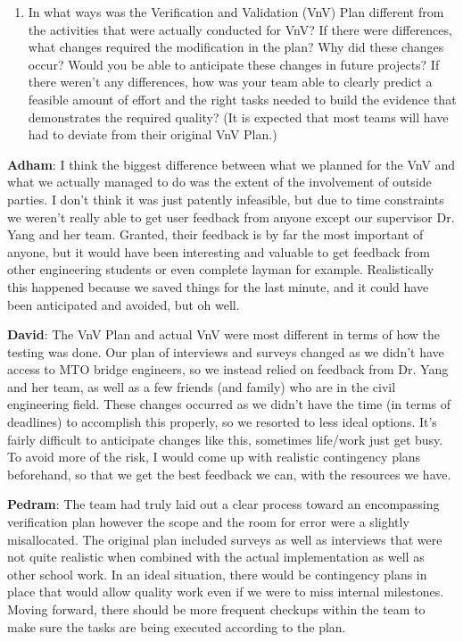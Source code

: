 \documentclass[12pt, titlepage]{article}
\begin{document}
\begin{enumerate}
  \item In what ways was the Verification and Validation (VnV) Plan different
  from the activities that were actually conducted for VnV?  If there were
  differences, what changes required the modification in the plan?  Why did
  these changes occur?  Would you be able to anticipate these changes in future
  projects?  If there weren't any differences, how was your team able to clearly
  predict a feasible amount of effort and the right tasks needed to build the
  evidence that demonstrates the required quality?  (It is expected that most
  teams will have had to deviate from their original VnV Plan.)
\end{enumerate}

\textbf{Adham}: I think the biggest difference between what we planned for the VnV and what we actually managed to do was the extent of the involvement of outside parties. I don't think it was just patently infeasible, but due to time constraints we weren't really able to get user feedback from anyone except our supervisor Dr. Yang and her team. Granted, their feedback is by far the most important of anyone, but it would have been interesting and valuable to get feedback from other engineering students or even complete layman for example. Realistically this happened because we saved things for the last minute, and it could have been anticipated and avoided, but oh well.

\textbf{David}: The VnV Plan and actual VnV were most different in terms of how the testing was done. Our plan of interviews and surveys changed as we didn't have access to MTO bridge engineers, so we instead relied on feedback from Dr. Yang and her team, as well as a few friends (and family) who are in the civil engineering field. These changes occurred as we didn't have the time (in terms of deadlines) to accomplish this properly, so we resorted to less ideal options. It's fairly difficult to anticipate changes like this, sometimes life/work just get busy. To avoid more of the risk, I would come up with realistic contingency plans beforehand, so that we get the best feedback we can, with the resources we have.

\textbf{Pedram}: The team had truly laid out a clear process toward an encompassing verification plan however the scope and the room for error were a slightly misallocated. The original plan included surveys as well as interviews that were not quite realistic when combined with the actual implementation as well as other school work. In an ideal situation, there would be contingency plans in place that would allow quality work even if we were to miss internal milestones. Moving forward, there should be more frequent checkups within the team to make sure the tasks are being executed according to the plan. 
\end{document}
